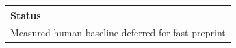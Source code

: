 \begin{tabular}{l}
\toprule
Status \\
\midrule
Measured human baseline deferred for fast preprint \\
\bottomrule
\end{tabular}
